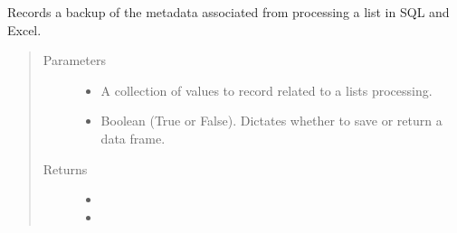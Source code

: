 \documentclass[letterpaper,10pt,english]{sphinxmanual}
\begin{document}

\begin{fulllineitems}
\label{\detokenize{index:ListManagement.utility.general.record_processing_stats}}
Records a backup of the metadata associated from processing a list in SQL and Excel.
\begin{quote}\begin{description}
\item[{Parameters}] \leavevmode\begin{itemize}
\item {} 
 \textendash{} A collection of values to record related to a lists processing.

\item {} 
 \textendash{} Boolean (True or False). Dictates whether to save or return a data frame.

\end{itemize}

\item[{Returns}] \leavevmode
\begin{itemize}
\item {} 

\item {} 

\end{itemize}


\end{description}\end{quote}

\end{fulllineitems}

\end{document}
